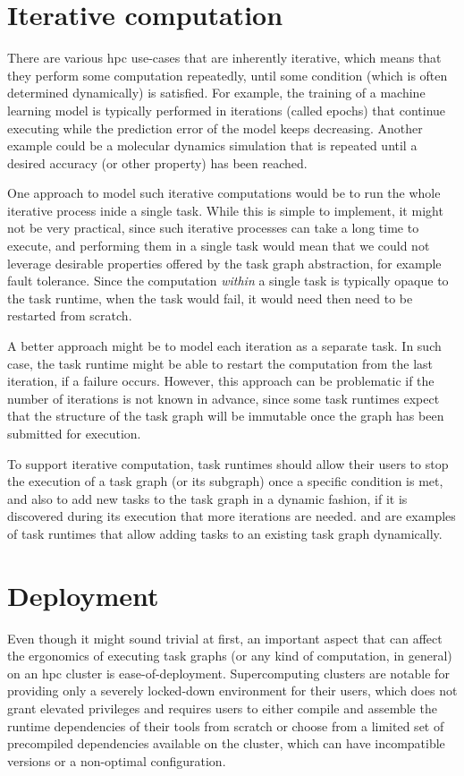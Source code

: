 \section{Iterative computation}
There are various \gls{hpc} use-cases that are inherently iterative, which means
that they perform some computation repeatedly, until some condition (which is often determined
dynamically) is satisfied. For example, the training of a machine learning model is typically
performed in iterations (called epochs) that continue executing while the prediction error of the
model keeps decreasing. Another example could be a molecular dynamics simulation that is repeated
until a desired accuracy (or other property) has been reached.

One approach to model such iterative computations would be to run the whole iterative process inide
a single task. While this is simple to implement, it might not be very practical, since such
iterative processes can take a long time to execute, and performing them in a single task would
mean that we could not leverage desirable properties offered by the task graph abstraction, for
example fault tolerance. Since the computation \emph{within} a single task is
typically opaque to the task runtime, when the task would fail, it would need then need to be
restarted from scratch.

A better approach might be to model each iteration as a separate task. In such case, the task
runtime might be able to restart the computation from the last iteration, if a failure occurs.
However, this approach can be problematic if the number of iterations is not known in advance,
since some task runtimes expect that the structure of the task graph will be immutable once the
graph has been submitted for execution.

To support iterative computation, task runtimes should allow their users to stop the execution of a
task graph (or its subgraph) once a specific condition is met, and also to add new tasks to the
task graph in a dynamic fashion, if it is discovered during its execution that more iterations are
needed. \dask{} and \ray{} are examples of task runtimes
that allow adding tasks to an existing task graph dynamically.

\section{Deployment}
Even though it might sound trivial at first, an important aspect that can affect the ergonomics of
executing task graphs (or any kind of computation, in general) on an \gls{hpc}
cluster is ease-of-deployment. Supercomputing clusters are notable for providing only a severely
locked-down environment for their users, which does not grant elevated privileges and requires
users to either compile and assemble the runtime dependencies of their tools from scratch or choose
from a limited set of precompiled dependencies available on the cluster, which can have
incompatible versions or a non-optimal configuration.

